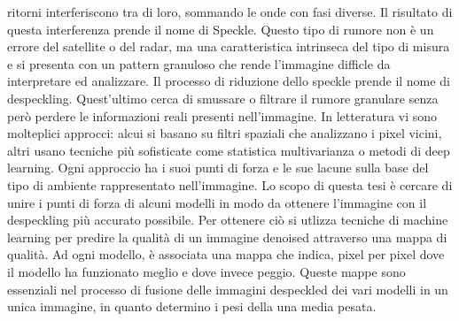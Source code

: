 ritorni interferiscono tra di loro, sommando le onde con fasi diverse. Il risultato di questa 
interferenza prende il nome di Speckle. Questo tipo di rumore non è un errore del satellite o 
del radar, ma una caratteristica intrinseca del tipo di misura e si presenta con un pattern granuloso
che rende l'immagine difficle da interpretare ed analizzare. Il processo di riduzione dello speckle 
prende il nome di despeckling. Quest'ultimo cerca di smussare o filtrare il rumore granulare senza 
però perdere le informazioni reali presenti nell'immagine. In letteratura vi sono molteplici 
approcci: alcui si basano su filtri spaziali che analizzano i pixel vicini, altri usano tecniche 
più sofisticate come statistica multivarianza o metodi di deep learning. Ogni approccio ha i suoi
punti di forza e le sue lacune sulla base del tipo di ambiente rappresentato nell'immagine. 
Lo scopo di questa tesi è cercare di unire i punti di forza di alcuni modelli in modo da ottenere l’immagine
con il despeckling più accurato possibile. Per ottenere ciò si utlizza tecniche di machine learning
per predire la qualità di un immagine denoised attraverso una mappa di qualità. Ad ogni modello,
è associata una mappa che indica, pixel per pixel dove il modello ha funzionato meglio e 
dove invece peggio. Queste mappe sono essenziali nel processo di fusione delle immagini despeckled 
dei vari modelli in un unica immagine, in quanto determino i pesi della una media pesata.
\medskip

